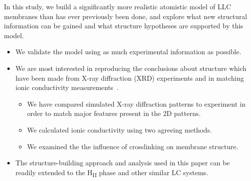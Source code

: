 \documentclass{article}
\begin{document}
  
  In this study, we build a significantly more realistic atomistic model of LLC membranes
  than has ever previously been done, and explore what new structural information can be gained
  and what structure hypotheses are supported by this model.

  \begin{itemize}
    \item We validate the model using as much experimental information as possible.
    \item We are most interested in reproducing the conclusions about structure
    which have been made from X-ray diffraction (XRD) experiments and in matching ionic
    conductivity measurements~\cite{feng_thin_2016}.
    \begin{itemize}
	    \item We have compared simulated X-ray diffraction patterns to experiment in 
	    order to match major features present in the 2D patterns.
	    \item We calculated ionic conductivity using two agreeing methods.
	    \item We examined the the influence of crosslinking on membrane structure.
    \end{itemize}
    \item The structure-building approach and analysis used in this paper can be readily extended
    to the H\textsubscript{II} phase and other similar LC systems.
  \end{itemize}
  
\end{document}
